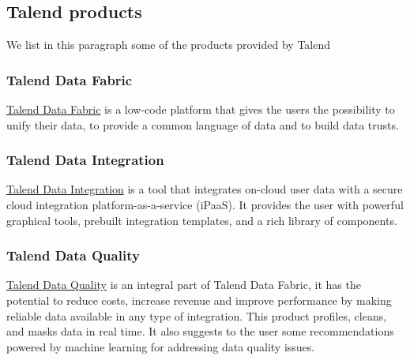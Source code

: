 \subsection*{Talend products}
We list in this paragraph some of the products provided by Talend
\subsubsection*{Talend Data Fabric}
\href{https://www.talend.com/products/data-fabric/}{Talend Data Fabric} is a
low-code platform that gives the users the possibility to unify their data, to
provide a common language of data and to build data trusts.

\subsubsection*{Talend Data Integration}
\href{https://www.talend.com/products/integrate-data/}{Talend Data Integration} 
is a tool that integrates on-cloud user data with a secure cloud integration
platform-as-a-service (iPaaS). It provides the user with powerful graphical
tools, prebuilt integration templates, and a rich library of components.

\subsubsection*{Talend Data Quality}
\href{https://www.talend.com/products/data-quality/}{Talend Data Quality} is an
integral part of Talend Data Fabric, it has the potential to reduce costs,
increase revenue and improve performance by making reliable data available in
any type of integration. This product profiles, cleans, and masks data in real
time. It also suggests to the user some recommendations powered by machine
learning for addressing data quality issues.






